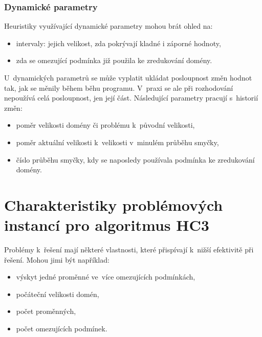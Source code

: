 \subsubsection{Dynamické parametry}

Heuristiky využívající dynamické parametry mohou brát ohled na:

\begin{itemize}
    \item intervaly:
        \subitem jejich velikost,
        \subitem zda pokrývají kladné i záporné hodnoty,
    \item zda se omezující podmínka již použila ke zredukování domény.
\end{itemize}

U~dynamických parametrů se může vyplatit ukládat posloupnost změn hodnot tak, jak se měnily během běhu programu. V~praxi se ale při rozhodování nepoužívá celá posloupnost, jen její část. Následující parametry pracují s~historií změn:

\begin{itemize}
  \item poměr velikosti domény či problému k~původní velikosti,
  \item poměr aktuální velikosti k~velikosti v~minulém průběhu smyčky,
  \item číslo průběhu smyčky, kdy se naposledy používala podmínka ke zredukování domény.
\end{itemize}


\section{Charakteristiky problémových instancí pro algoritmus HC3}

Problémy k~řešení mají některé vlastnosti, které přispívají k~nižší efektivitě při řešení. Mohou jimi být například:


\begin{itemize}
  \item výskyt jedné proměnné ve~více omezujících podmínkách,
  \item počáteční velikosti domén,
  \item počet proměnných,
  \item počet omezujících podmínek.
\end{itemize}

